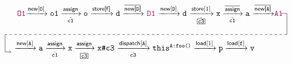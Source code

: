 {\begin{equation}
\begin{tabular}{l}
\begin{tikzpicture}[-, remember picture,overlay]
\draw(\lx-\offset, \ly) -- (\lx, \ly) -- (\lx, \dy);
\draw[dashed] (\lx, \dy) -- (\nx,\dy);
\draw(\nx,\dy) -- (\nx, \ny);
\draw[->] (\nx, \ny) -- (\nx+\offset, \ny);
\end{tikzpicture}
\commentfont{O1}$\xrightarrow{\new[\texttt{O}]}
\texttt{o1}\xrightarrow[\hat{\mathtt{c1}}]{\assign}
\texttt{o} \xrightarrow{\storefield{f}} \texttt{d}
\xrightarrow{\inewfield{\texttt{D}}}$ \commentfont{D1} 
$\xrightarrow{\new[\texttt{D}]} 
\texttt{d}$ $\xrightarrow[\hat{\boxed{\texttt{c3}}}]{\store[1]}\texttt{x}\xrightarrow[\check{\texttt{c1}}]{\iassign}\texttt{a} $ $\xrightarrow{\inewfield{\texttt{A}}}$\commentfont{A1} \\[6ex]
$\xrightarrow{\new[\texttt{A}]}\texttt{a}\xrightarrow[\hat{\texttt{c1}}]{\assign}\texttt{x} \xrightarrow[\check{\boxed{\texttt{c3}}}]{\assign} \texttt{x\#c3}$ $\xrightarrow[\hat{\texttt{c3}}]{\indispatch[\texttt{A}]}\texttt{this}^\texttt{A:foo()}
\xrightarrow{\load[1]}\texttt{p}
    \xrightarrow{\load[\texttt{f}]} \texttt{v}$ \\[3ex]
\end{tabular}
\end{equation}
}

